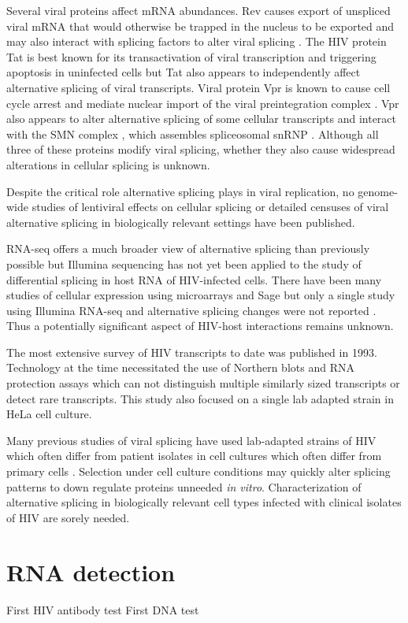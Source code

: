 \documentclass[../sherrill-Mix_thesis.tex]{subfiles}
\begin{document}
	Several viral proteins affect mRNA abundances. Rev causes export of unspliced viral mRNA that would otherwise be trapped in the nucleus \citep{Legrain1989} to be exported \citep{Fischer1994,Pollard1998} and may also interact with splicing factors to alter viral splicing \citep{Tange1996}. The HIV protein Tat is best known for its transactivation of viral transcription \citep{Sodroski1985,Jones1994} and triggering apoptosis in uninfected cells \citep{McCloskey1997,Campbell2004} but Tat also appears to independently affect alternative splicing of viral transcripts\citep{Berro2006,Bohne2007,Jablonski2010,Miller2011}. Viral protein Vpr is known to cause cell cycle arrest \citep{Rogel1995} and mediate nuclear import of the viral preintegration complex \citep{Fouchier1998}. Vpr also appears to alter alternative splicing of some cellular transcripts \citep{Kuramitsu2005,Hashizume2007} and interact with the SMN complex \citep{Jager2012}, which assembles spliceosomal snRNP \citep{Gubitz2004}. Although all three of these proteins modify viral splicing, whether they also cause widespread alterations in cellular splicing is unknown.

	Despite the critical role alternative splicing plays in viral replication, no genome-wide studies of lentiviral effects on cellular splicing or  detailed censuses of viral alternative splicing in biologically relevant settings have been published.

	RNA-seq offers a much broader view of alternative splicing than previously possible \citep{Trapnell2010,Rogers2012} but Illumina sequencing has not yet been applied to the study of differential splicing in host RNA of HIV-infected cells. There have been many studies of cellular expression using microarrays \citep{Vahey2002,Wout2003,Mitchell2003,Rotger2010,Miller2011} and Sage \citep{Ryo1999,Lefebvre2011} but only a single study using Illumina RNA-seq and alternative splicing changes were not reported \citep{Chang2011}. Thus a potentially significant aspect of HIV-host interactions remains unknown.

	The most extensive survey of HIV transcripts to date was published in 1993\citep{Purcell1993}. Technology at the time necessitated the use of Northern blots and RNA protection assays \citep{Purcell1993} which can not distinguish multiple similarly sized transcripts or detect rare transcripts. This study also focused on a single lab adapted \hivNL{} strain in HeLa cell culture.

	Many previous studies of viral splicing have used lab-adapted strains of HIV which often differ from patient isolates \citep{Fujita1992} in cell cultures which often differ from primary cells \citep{McAllister1971}. Selection under cell culture conditions may quickly alter splicing patterns to down regulate proteins unneeded \emph{in vitro}.  Characterization of alternative splicing in biologically relevant cell types infected with clinical isolates of HIV are sorely needed.


\section{RNA detection}
	First HIV antibody test \citep{Safai1984,Sarngadharan1984} First DNA test \citep{Ou1988}
\end{document}
